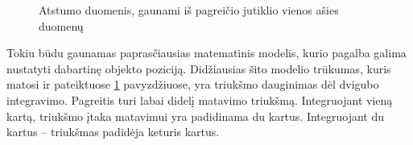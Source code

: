 \begin{figure}
    \centering
    \qquad
    \qquad
    \caption{Atstumo duomenis, gaunami iš pagreičio jutiklio vienos ašies duomenų}
    \label{fig:ax_accel_velocity_distance}
\end{figure}


Tokiu būdu gaunamas paprasčiausias matematinis modelis, kurio pagalba galima nustatyti dabartinę objekto poziciją.
Didžiausias šito modelio trūkumas, kuris matosi ir pateiktuose \ref{fig:ax_accel_velocity_distance} pavyzdžiuose, yra triukšmo dauginimas dėl dvigubo integravimo.
Pagreitis turi labai didelį matavimo triukšmą.
Integruojant vieną kartą, triukšmo įtaka matavimui yra padidinama du kartus.
Integruojant du kartus -- triukšmas padidėja keturis kartus.

